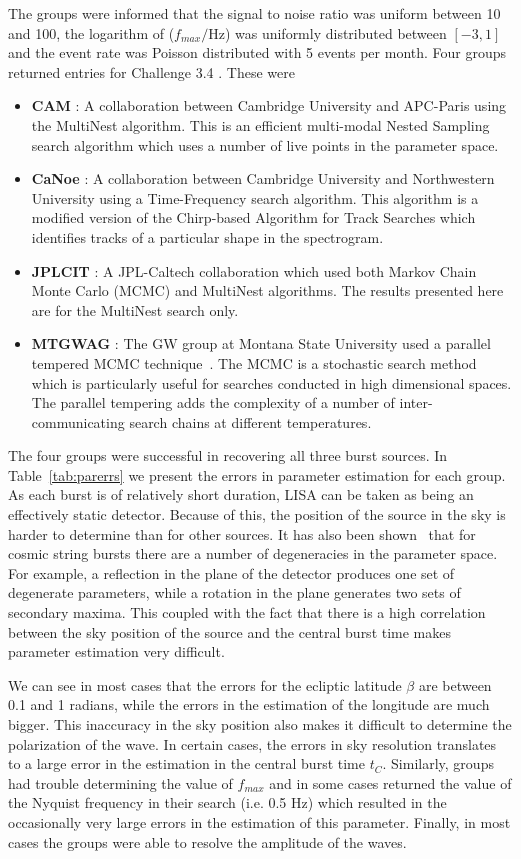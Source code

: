 \documentclass{iopart}
\begin{document}
The groups were informed that the signal to noise ratio was uniform between 10 and 100, the logarithm of ($f_{max}/$Hz) was uniformly distributed between $[-3,1]$ and the event rate was Poisson distributed with 5 events per month.  Four groups returned entries for Challenge 3.4 .  These were
\begin{itemize}
\item \textbf{CAM} :  A collaboration between Cambridge University and APC-Paris using the MultiNest algorithm. This is an efficient multi-modal
Nested Sampling search algorithm which uses a number of live points in the parameter space.  
\item \textbf{CaNoe} : A collaboration between Cambridge University and Northwestern University using a Time-Frequency search algorithm. This algorithm is a modified
version of the Chirp-based Algorithm for Track Searches which identifies tracks of a particular shape in the spectrogram.
\item \textbf{JPLCIT} : A JPL-Caltech collaboration which used both Markov Chain Monte Carlo (MCMC) and MultiNest algorithms.  The results presented here are for 
the MultiNest search only.
\item \textbf{MTGWAG} : The GW group at Montana State University used a parallel tempered MCMC technique~\cite{keycornish}.  The MCMC is a stochastic search method which is particularly
useful for searches conducted in high dimensional spaces.  The parallel tempering adds the complexity of a number of inter-communicating search
chains at different temperatures.
\end{itemize}

The four groups were successful in recovering all three burst sources.  In Table~\ref{tab:parerrs} we present the errors in parameter estimation for each group.  As each burst is of relatively short duration, LISA can be taken as being an effectively static detector.  Because of this, the position of the source in the sky is harder to determine than for other sources.  It has also been shown~\cite{keycornish} that for cosmic string bursts there are a number of degeneracies in the parameter space.  For example, a reflection in the plane of the detector produces one set of degenerate parameters, while a rotation in the plane generates two sets of secondary maxima.  This coupled with the fact that there is a high correlation between the sky position of the source and the central burst time makes parameter estimation very difficult.  

We can see in most cases that the errors for the ecliptic latitude $\beta$ are between 0.1 and 1 radians, while the errors in the estimation of the longitude are much bigger.  This inaccuracy in the sky position also makes it difficult to determine the polarization of the wave.  In certain cases, the errors in sky resolution translates to a large error in the estimation in the central burst time $t_C$.   Similarly, groups had trouble determining the value of $f_{max}$ and in some cases returned the value of the Nyquist frequency in their search (i.e. 0.5 Hz) which resulted in the occasionally very large errors in the estimation of this parameter. Finally, in most cases the groups were able to resolve the amplitude of the waves.
\end{document}
